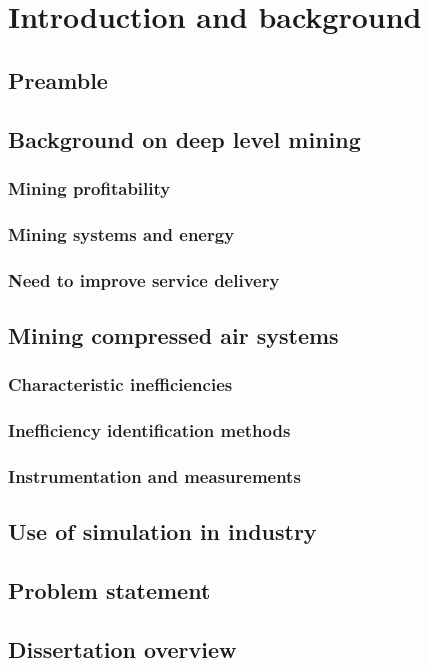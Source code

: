 \chapter{Introduction and background}  %
\setcounter{page}{1}
\section{Preamble}

\section{Background on deep level mining}
\subsection{Mining profitability}
\subsection{Mining systems and energy}
\subsection{Need to improve service delivery}
\section{Mining compressed air systems}
	\subsection{Characteristic inefficiencies}
	\subsection{Inefficiency identification methods}
	\subsection{Instrumentation and measurements}
\section{Use of simulation in industry}
\section{Problem statement}
\section{Dissertation overview}